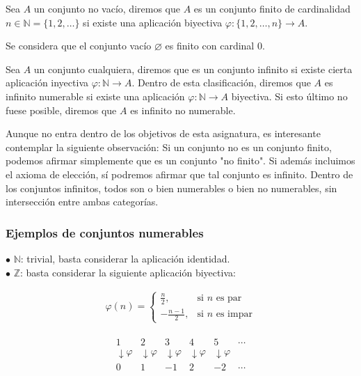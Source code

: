 \documentclass[12pt,a4paper]{article}
\newcommand{\N}{\mathbb{N}}
\newcommand{\Z}{\mathbb{Z}}
\begin{document}
Sea $A$ un conjunto no vacío, diremos que $A$ es un conjunto finito de cardinalidad $n \in \N = \{1,2,\ldots\}$ si existe una aplicación biyectiva $\varphi : \{1,2,\ldots,n\} \to A$.

\noindent Se considera que el conjunto vacío $\varnothing$ es finito con cardinal $0$.

\vspace{4mm}

Sea $A$ un conjunto cualquiera, diremos que es un conjunto infinito si existe cierta aplicación inyectiva $\varphi : \N \to A$. Dentro de esta clasificación, diremos que $A$ es infinito numerable si existe una aplicación $\varphi : \N \to A$ biyectiva. Si esto último no fuese posible, diremos que $A$ es infinito no numerable.

\vspace{4mm}

Aunque no entra dentro de los objetivos de esta asignatura, es interesante contemplar la siguiente observación: Si un conjunto no es un conjunto finito, podemos afirmar simplemente que es un conjunto "no finito". Si además incluimos el axioma de elección, sí podremos afirmar que tal conjunto es infinito. Dentro de los conjuntos infinitos, todos son o bien numerables o bien no numerables, sin intersección entre ambas categorías.

\vspace{4mm}

\subsubsection{Ejemplos de conjuntos numerables}

$\bullet$ $\N$: trivial, basta considerar la aplicación identidad. \\

\noindent
$\bullet$ $\Z$: basta considerar la siguiente aplicación biyectiva:

\begin{minipage}{0.5\textwidth}
\begin{align*}
\varphi(n) =
\begin{cases}
\frac{n}{2}, & \text{si } n \text{ es par} \\
-\frac{n-1}{2}, & \text{si } n \text{ es impar}
\end{cases}
\end{align*}
\end{minipage}%
\begin{minipage}{0.5\textwidth}
\begin{align*}
\begin{array}{cccccc}
1 & 2 & 3 & 4 & 5 & \cdots \\
\downarrow\!\varphi & \downarrow\!\varphi & \downarrow\!\varphi & \downarrow\!\varphi & \downarrow\!\varphi & \\
0 & 1 & -1 & 2 & -2 & \cdots
\end{array}
\end{align*}
\end{minipage}
\end{document}
